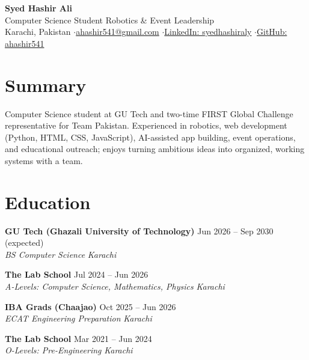 \documentclass[10pt,a4paper]{article}
\newcommand{\entry}[4]{%
  \vspace{2pt}\textbf{#1} \hfill {\small #2}\\
  \textit{#3} \hfill {\small\textit{#4}}\par}
\begin{document}
\begin{center}
  {\LARGE\bfseries Syed Hashir Ali}\\[3pt]
  {\small Computer Science Student \textperiodcentered{} Robotics \& Event Leadership}\\[3pt]
  {\small Karachi, Pakistan \enspace$\cdot$\enspace \href{mailto:ahashir541@gmail.com}{ahashir541@gmail.com} \enspace$\cdot$\enspace \href{https://www.linkedin.com/in/syedhashiraly}{LinkedIn: syedhashiraly} \enspace$\cdot$\enspace \href{https://github.com/ahashir541}{GitHub: ahashir541}}
\end{center}

\section{Summary}
Computer Science student at GU Tech and two-time FIRST Global Challenge representative for Team Pakistan. Experienced in robotics, web development (Python, HTML, CSS, JavaScript), AI-assisted app building, event operations, and educational outreach; enjoys turning ambitious ideas into organized, working systems with a team.

\section{Education}
\entry{GU Tech (Ghazali University of Technology)}{Jun 2026 -- Sep 2030 (expected)}{BS Computer Science}{Karachi}
\entry{The Lab School}{Jul 2024 -- Jun 2026}{A-Levels: Computer Science, Mathematics, Physics}{Karachi}
\entry{IBA Grads (Chaajao)}{Oct 2025 -- Jun 2026}{ECAT Engineering Preparation}{Karachi}
\entry{The Lab School}{Mar 2021 -- Jun 2024}{O-Levels: Pre-Engineering}{Karachi}
\end{document}
